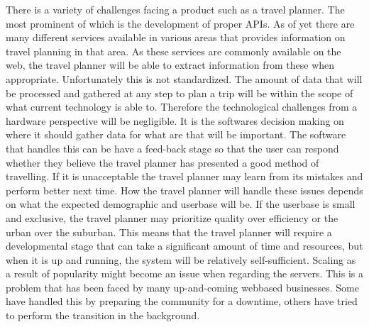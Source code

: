 There is a variety of challenges facing a product such as a travel planner. The
most prominent of which is the development of proper APIs. As of yet there are
many different services available in various areas that provides information on
travel planning in that area. As these services are commonly available on the
web, the travel planner will be able to extract information from these when
appropriate. Unfortunately this is not standardized. The amount of data that
will be processed and gathered at any step to plan a trip will be within the
scope of what current technology is able to. Therefore the technological
challenges from a hardware perspective will be negligible. It is the softwares
decision making on where it should gather data for what are that will be
important. The software that handles this can be have a feed-back stage so that
the user can respond whether they believe the travel planner has presented a
good method of travelling. If it is unacceptable the travel planner may learn
from its mistakes and perform better next time. How the travel planner will
handle these issues depends on what the expected demographic and userbase will
be. If the userbase is small and exclusive, the travel planner may prioritize
quality over efficiency or the urban over the suburban. This means that the
travel planner will require a developmental stage that can take a significant
amount of time and resources, but when it is up and running, the system will be
relatively self-sufficient. Scaling as a result of popularity might become an
issue when regarding the servers. This is a problem that has been faced by many
up-and-coming webbased businesses. Some have handled this by preparing the
community for a downtime, others have tried to perform the transition in the
background. 

